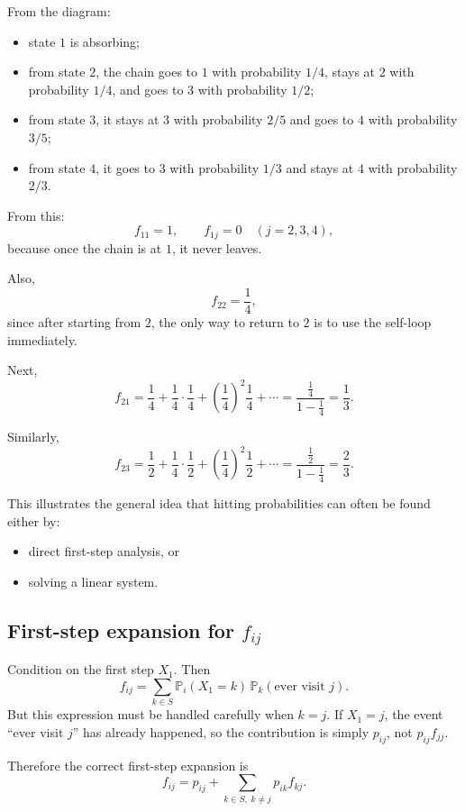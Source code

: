 \documentclass[11pt]{article}
\theoremstyle{definition}
\begin{document}
From the diagram:
\begin{itemize}[leftmargin=2em]
    \item state \(1\) is absorbing;
    \item from state \(2\), the chain goes to \(1\) with probability \(1/4\), stays at \(2\) with probability \(1/4\), and goes to \(3\) with probability \(1/2\);
    \item from state \(3\), it stays at \(3\) with probability \(2/5\) and goes to \(4\) with probability \(3/5\);
    \item from state \(4\), it goes to \(3\) with probability \(1/3\) and stays at \(4\) with probability \(2/3\).
\end{itemize}

From this:
\[
f_{11}=1,
\qquad
f_{1j}=0 \quad (j=2,3,4),
\]
because once the chain is at \(1\), it never leaves.

Also,
\[
f_{22}=\frac14,
\]
since after starting from \(2\), the only way to return to \(2\) is to use the self-loop immediately.

Next,
\[
f_{21}
=
\frac14+\frac14\cdot\frac14+\left(\frac14\right)^2\frac14+\cdots
=
\frac{\frac14}{1-\frac14}
=
\frac13.
\]

Similarly,
\[
f_{23}
=
\frac12+\frac14\cdot\frac12+\left(\frac14\right)^2\frac12+\cdots
=
\frac{\frac12}{1-\frac14}
=
\frac23.
\]

This illustrates the general idea that hitting probabilities can often be found either by:
\begin{itemize}[leftmargin=2em]
    \item direct first-step analysis, or
    \item solving a linear system.
\end{itemize}

\subsection{First-step expansion for \texorpdfstring{$f_{ij}$}{fij}}

Condition on the first step \(X_1\). Then
\[
f_{ij}
=
\sum_{k\in S} \mathbb P_i(X_1=k)\,\mathbb P_k(\text{ever visit } j).
\]
But this expression must be handled carefully when \(k=j\). If \(X_1=j\), the event ``ever visit \(j\)'' has already happened, so the contribution is simply \(p_{ij}\), not \(p_{ij}f_{jj}\).

Therefore the correct first-step expansion is
\[
f_{ij}
=
p_{ij}
+
\sum_{k\in S,\;k\neq j} p_{ik}f_{kj}.
\]
\end{document}

